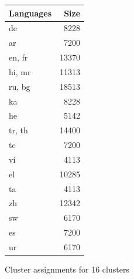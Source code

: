\begin{figure}[ht]
\begin{subtable}{0.49\textwidth}
    \end{subtable}
    \hfill
    \begin{subtable}{0.49\textwidth}
        \centering
        \begin{tabular}{lr}
            \toprule
            Languages & Size \\
            \midrule
            de & 8228 \\
            ar & 7200 \\
            en, fr & 13370 \\
            hi, mr & 11313 \\
            ru, bg & 18513 \\
            ka & 8228 \\
            he & 5142 \\
            tr, th & 14400 \\
            te & 7200 \\
            vi & 4113 \\
            el & 10285 \\
            ta & 4113 \\
            zh & 12342 \\
            sw & 6170 \\
            es & 7200 \\
            ur & 6170 \\
            \bottomrule
        \end{tabular}
        \caption{\citet{liang_xlm-v_2023}}
        \label{tab:liang_clusters_k4}
    \end{subtable}

    \caption{Cluster assignments for 16 clusters}
    \label{fig:multiple_tables}
\end{figure}

